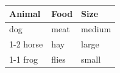 \documentclass{article}
\begin{document}
	\begin{tabular}{lll}
		\toprule
		Animal & Food  & Size   \\
		\midrule
		dog    & meat  & medium \\
		\cmidrule{1-2}
		horse  & hay   & large  \\
		\cmidrule{1-1}
		\cmidrule{3-3}
		frog   & flies & small  \\
		\bottomrule
	\end{tabular}
\end{document}
